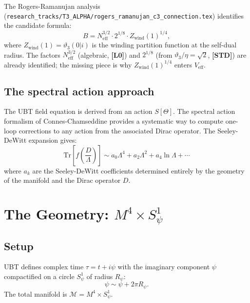 \documentclass[12pt,a4paper]{article}
\theoremstyle{remark}
\newcommand{\STD}{\textbf{[STD]}}
\newcommand{\Lzero}{\textbf{[L0]}}
\begin{document}
The Rogers-Ramanujan analysis
(\texttt{research\_tracks/T3\_ALPHA/rogers\_ramanujan\_c3\_connection.tex})
identifies the candidate formula:
\begin{equation}
  B = N_{\mathrm{eff}}^{3/2}\cdot 2^{1/8}\cdot Z_{\mathrm{wind}}(1)^{1/4},
  \label{eq:B_candidate}
\end{equation}
where $Z_{\mathrm{wind}}(1) = \vartheta_3(0|i)$ is the winding partition function
at the self-dual radius.  The factors $N_{\mathrm{eff}}^{3/2}$ (algebraic, \Lzero)
and $2^{1/8}$ (from $\vartheta_3/\eta = \sqrt{2}$, \STD) are already identified;
the missing piece is why $Z_{\mathrm{wind}}(1)^{1/4}$ enters $V_{\mathrm{eff}}$.

\subsection{The spectral action approach}

The UBT field equation is derived from an action $S[\Theta]$.
The spectral action formalism of Connes-Chamseddine provides a systematic way
to compute one-loop corrections to any action from the associated Dirac operator.
The Seeley-DeWitt expansion gives:
\begin{equation}
  \mathrm{Tr}\!\left[f\!\left(\frac{D}{\Lambda}\right)\right]
  \sim a_0\Lambda^4 + a_2\Lambda^2 + a_4\ln\Lambda + \cdots
  \label{eq:spectral_expansion}
\end{equation}
where $a_k$ are the Seeley-DeWitt coefficients determined entirely by the
geometry of the manifold and the Dirac operator $D$.

\section{The Geometry: $M^4\times S^1_\psi$}
\label{sec:geometry}

\subsection{Setup}

UBT defines complex time $\tau = t + i\psi$ with the imaginary component $\psi$
compactified on a circle $S^1_\psi$ of radius $R_\psi$:
\begin{equation}
  \psi \sim \psi + 2\pi R_\psi.
\end{equation}
The total manifold is $\mathcal{M} = M^4\times S^1_\psi$.
\end{document}
